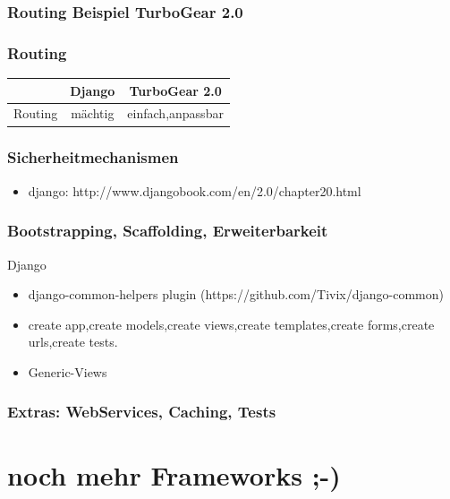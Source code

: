\documentclass[
    t,
    smaller,
    compress,
    xcolor=svgnames,            %
    table,
]{beamer}
\begin{document}
\begin{frame}[fragile]
\frametitle{Routing Beispiel TurboGear 2.0}

\end{frame}

\begin{frame}
    \frametitle{Routing}

    \begin{table}[h]
        \begin{tabular}{|c|c|c|}
            \hline
             & Django & TurboGear 2.0  \\ \hline
            Routing & \cellcolor{dkgreen} mächtig & \cellcolor{dkgreen} einfach,anpassbar     \\ \hline
         \end{tabular}
    \end{table}
\end{frame}


\begin{frame}
  \frametitle{Sicherheitmechanismen}

  \begin{itemize}[<1->]
    \item django: http://www.djangobook.com/en/2.0/chapter20.html
    \end{itemize}

\end{frame}


\begin{frame}[fragile]
  \frametitle{Bootstrapping, Scaffolding, Erweiterbarkeit}
Django
 \begin{itemize}[<1->]
    \item django-common-helpers plugin (https://github.com/Tivix/django-common)
    \item create app,create models,create views,create templates,create forms,create urls,create tests.
    \item Generic-Views
 \end{itemize}
    \vspace{15pt}


\end{frame}


\begin{frame}
  \frametitle{Extras: WebServices, Caching, Tests}
\end{frame}


\section{noch mehr Frameworks ;-)}
\end{document}
